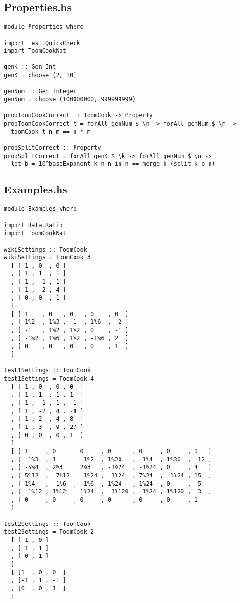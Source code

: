 \subsection{Properties.hs}
\begin{verbatim}
module Properties where

import Test.QuickCheck
import ToomCookNat

genK :: Gen Int
genK = choose (2, 10)

genNum :: Gen Integer
genNum = choose (100000000, 999999999)

propToomCookCorrect :: ToomCook -> Property
propToomCookCorrect t = forAll genNum $ \n -> forAll genNum $ \m ->
  toomCook t n m == n * m

propSplitCorrect :: Property
propSplitCorrect = forAll genK $ \k -> forAll genNum $ \n ->
  let b = 10^baseExponent k n n in n == merge b (split k b n)
\end{verbatim}

\subsection{Examples.hs}
\begin{verbatim}
module Examples where

import Data.Ratio
import ToomCookNat

wikiSettings :: ToomCook
wikiSettings = ToomCook 3
  [ [ 1 , 0  , 0 ]
  , [ 1 , 1  , 1 ]
  , [ 1 , -1 , 1 ]
  , [ 1 , -2 , 4 ]
  , [ 0 , 0  , 1 ]
  ]
  [ [ 1    , 0   , 0   , 0    , 0  ]
  , [ 1%2  , 1%3 , -1  , 1%6  , -2 ]
  , [ -1   , 1%2 , 1%2 , 0    , -1 ]
  , [ -1%2 , 1%6 , 1%2 , -1%6 , 2  ]
  , [ 0    , 0   , 0   , 0    , 1  ]
  ]

test1Settings :: ToomCook
test1Settings = ToomCook 4
  [ [ 1 , 0  , 0 , 0  ]
  , [ 1 , 1  , 1 , 1  ]
  , [ 1 , -1 , 1 , -1 ]
  , [ 1 , -2 , 4 , -8 ]
  , [ 1 , 2  , 4 , 8  ]
  , [ 1 , 3  , 9 , 27 ]
  , [ 0 , 0  , 0 , 1  ]
  ]
  [ [ 1     , 0     , 0     , 0      , 0     , 0     , 0   ]
  , [ -1%3  , 1     , -1%2  , 1%20   , -1%4  , 1%30  , -12 ]
  , [ -5%4  , 2%3   , 2%3   , -1%24  , -1%24 , 0     , 4   ]
  , [ 5%12  , -7%12 , -1%24 , -1%24  , 7%24  , -1%24 , 15  ]
  , [ 1%4   , -1%6  , -1%6  , 1%24   , 1%24  , 0     , -5  ]
  , [ -1%12 , 1%12  , 1%24  , -1%120 , -1%24 , 1%120 , -3  ]
  , [ 0     , 0     , 0     , 0      , 0     , 0     , 1   ]
  ]

test2Settings :: ToomCook
test2Settings = ToomCook 2
  [ [ 1 , 0 ]
  , [ 1 , 1 ]
  , [ 0 , 1 ]
  ]
  [ [1  , 0 , 0  ]
  , [-1 , 1 , -1 ]
  , [0  , 0 , 1  ]
  ]
\end{verbatim}
